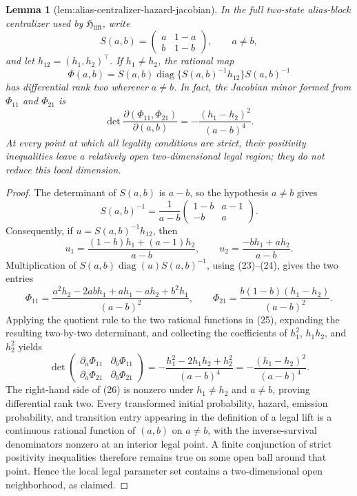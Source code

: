 \documentclass{article}
\newtheorem{lemma}{Lemma}
\begin{document}
\begin{lemma}[lem:alias-centralizer-hazard-jacobian]\label{lem:alias-centralizer-hazard-jacobian}
In the full two-state alias-block centralizer used by \(\mathfrak H_{\mathrm{lift}}\), write
\[
 S(a,b)=\begin{pmatrix}a&1-a\\ b&1-b\end{pmatrix},\qquad a\ne b,
\]
and let \(h_{12}=(h_1,h_2)^{\top}\). If \(h_1\ne h_2\), the rational map
\[
 \Phi(a,b)=S(a,b)\operatorname{diag}\{S(a,b)^{-1}h_{12}\}S(a,b)^{-1}
\]
has differential rank two wherever \(a\ne b\). In fact, the Jacobian minor formed from \(\Phi_{11}\) and \(\Phi_{21}\) is
\[
 \det\frac{\partial(\Phi_{11},\Phi_{21})}{\partial(a,b)}
 =-\frac{(h_1-h_2)^2}{(a-b)^4}.
\]
At every point at which all legality conditions are strict, their positivity inequalities leave a relatively open two-dimensional legal region; they do not reduce this local dimension.
\end{lemma}
\begin{proof}
The determinant of \(S(a,b)\) is \(a-b\), so the hypothesis \(a\ne b\) gives
\[
 S(a,b)^{-1}=\frac{1}{a-b}
 \begin{pmatrix}1-b&a-1\\-b&a\end{pmatrix}.                  \tag{23}
\]
Consequently, if \(u=S(a,b)^{-1}h_{12}\), then
\[
 u_1=\frac{(1-b)h_1+(a-1)h_2}{a-b},\qquad
 u_2=\frac{-bh_1+ah_2}{a-b}.                                  \tag{24}
\]
Multiplication of \(S(a,b)\operatorname{diag}(u)S(a,b)^{-1}\), using (23)--(24), gives the two entries
\[
 \Phi_{11}
 =\frac{a^2h_2-2abh_1+ah_1-ah_2+b^2h_1}{(a-b)^2},\qquad
 \Phi_{21}=\frac{b(1-b)(h_1-h_2)}{(a-b)^2}.                   \tag{25}
\]
Applying the quotient rule to the two rational functions in (25), expanding the resulting two-by-two determinant, and collecting the coefficients of \(h_1^2\), \(h_1h_2\), and \(h_2^2\) yields
\[
 \det\begin{pmatrix}
 \partial_a\Phi_{11}&\partial_b\Phi_{11}\\
 \partial_a\Phi_{21}&\partial_b\Phi_{21}
 \end{pmatrix}
 =-\frac{h_1^2-2h_1h_2+h_2^2}{(a-b)^4}
 =-\frac{(h_1-h_2)^2}{(a-b)^4}.                               \tag{26}
\]
The right-hand side of (26) is nonzero under \(h_1\ne h_2\) and \(a\ne b\), proving differential rank two. Every transformed initial probability, hazard, emission probability, and transition entry appearing in the definition of a legal lift is a continuous rational function of \((a,b)\) on \(a\ne b\), with the inverse-survival denominators nonzero at an interior legal point. A finite conjunction of strict positivity inequalities therefore remains true on some open ball around that point. Hence the local legal parameter set contains a two-dimensional open neighborhood, as claimed.
\end{proof}
\end{document}
